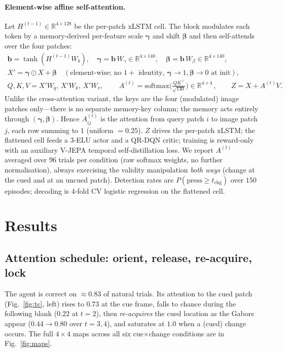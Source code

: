 \documentclass[11pt]{article}
\newcommand{\Rd}{\mathbb{R}}
\begin{document}
\paragraph{Element-wise affine self-attention.} Let $H^{(t-1)}\in\Rd^{4\times128}$ be the per-patch xLSTM
cell. The block modulates each token by a memory-derived per-feature scale $\bm\gamma$ and shift
$\bm\beta$ and then self-attends over the four patches:
\begin{align}
\bm b=\tanh(H^{(t-1)}W_b),\quad
\bm\gamma=\bm b\,W_\gamma\in\Rd^{4\times140},\quad \bm\beta=\bm b\,W_\beta\in\Rd^{4\times140},\\
X' = \bm\gamma\odot X + \bm\beta\quad(\text{element-wise; no $1{+}$ identity, } \bm\gamma\!\to\!1,\bm\beta\!\to\!0\text{ at init}),\\
Q,K,V = X'W_q,\,X'W_k,\,X'W_v,\qquad
\boxed{\,A^{(t)}=\mathrm{softmax}\!\Big(\tfrac{QK^\top}{\sqrt{140}}\Big)\in\Rd^{4\times4}\,},\qquad Z=X+A^{(t)}V .
\end{align}
Unlike the cross-attention variant, the keys are the four (modulated) image patches only---there is no
separate memory-key column; the memory acts entirely through $(\bm\gamma,\bm\beta)$. Hence $A^{(t)}_{ij}$
is the attention from query patch $i$ to image patch $j$, each row summing to $1$ (uniform $=0.25$). $Z$
drives the per-patch xLSTM; the flattened cell feeds a 3-ELU actor and a QR-DQN critic; training is
reward-only with an auxiliary V-JEPA temporal self-distillation loss. We report $A^{(t)}$ averaged over
$96$ trials per condition (raw softmax weights, no further normalisation), always exercising the
validity manipulation \emph{both ways} (change at the cued and at an uncued patch). Detection rates are
$P(\text{press}\ge t_{\text{chg}})$ over $150$ episodes; decoding is 4-fold CV logistic regression on the
flattened cell.

\section{Results}
\subsection{Attention schedule: orient, release, re-acquire, lock}
The agent is correct on $\approx0.83$ of natural trials. Its attention to the cued patch
(Fig.~\ref{fig:tc}, left) rises to $0.73$ at the cue frame, falls to chance during the following blank
($0.22$ at $t{=}2$), then \emph{re-acquires} the cued location as the Gabors appear ($0.44\to0.80$ over
$t{=}3,4$), and saturates at $1.0$ when a (cued) change occurs. The full $4\times4$ maps across all six
cue$\times$change conditions are in Fig.~\ref{fig:maps}.
\end{document}
